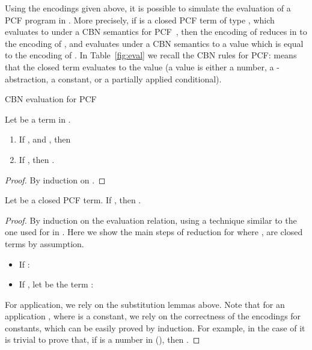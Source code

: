 \documentclass{article}
\begin{document}
Using the encodings given above, it is possible to simulate the
evaluation of a PCF program in \LLCIrec.
More precisely, if  is a
closed PCF term of type , which evaluates to  under a CBN
semantics for PCF~\cite{Plotkin77}, then the encoding of  reduces
in \LLCIrec to the encoding of , and evaluates under a CBN semantics
to a value which is equal to the encoding of .
In Table~\ref{fig:eval} we recall the CBN rules for PCF: 
means that the closed term  evaluates to the value  (a value is
either a number, a -abstraction, a constant, or a partially
applied conditional).
\begin{table*}
{


}
\caption{CBN evaluation for PCF}\label{fig:eval}
\end{table*}

\begin{lemma}[Substitution]\label{lemsub} Let  be a term in \LLCIrec.
\begin{enumerate}
\item\label{one}  If , and , then

\item\label{two} If , then .
\end{enumerate}
\end{lemma}
\begin{proof}
By induction on .
\end{proof}

\begin{lemma}\label{lem:evalred}Let  be a closed PCF term. If , then .
\end{lemma}
\begin{proof}
By induction on the evaluation relation, using a technique
similar to the one used for \ST in \cite{AlvesS:TCS}.
Here we show the
main steps of reduction for  where , 
are closed terms by assumption.
\begin{itemize}
\item If : \\

\item If , let  be the term :\\

\end{itemize}
For application, we rely on the substitution lemmas above.
Note that for an application , where  is a constant, we rely on the correctness of the encodings for constants, which can be easily proved by induction. For example, in the case of  it is trivial to prove that, if  is a number
 in  (), then .
\end{proof}
\end{document}
